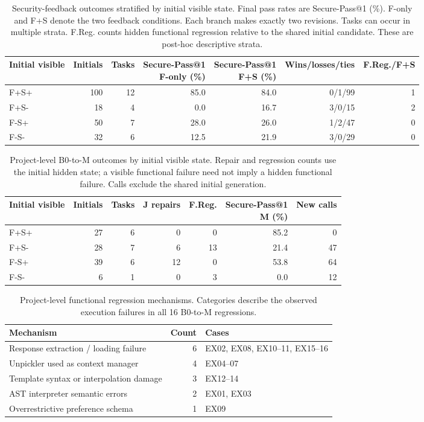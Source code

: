 \begin{table}[pos=htbp]
\caption{Security-feedback outcomes stratified by initial visible state. Final pass rates are Secure-Pass@1 (\%). F-only and F+S denote the two feedback conditions. Each branch makes exactly two revisions. Tasks can occur in multiple strata. F.Reg. counts hidden functional regression relative to the shared initial candidate. These are post-hoc descriptive strata.}
\centering\small
\begin{tabular}{lrrr rrr}
\toprule
Initial visible & Initials & Tasks & \shortstack{Secure-Pass@1\\F-only (\%)} & \shortstack{Secure-Pass@1\\F+S (\%)} & Wins/losses/ties & F.Reg./F+S \\
\midrule
F+S+ & 100 & 12 & 85.0 & 84.0 & 0/1/99 & 1 \\
F+S- & 18 & 4 & 0.0 & 16.7 & 3/0/15 & 2 \\
F-S+ & 50 & 7 & 28.0 & 26.0 & 1/2/47 & 0 \\
F-S- & 32 & 6 & 12.5 & 21.9 & 3/0/29 & 0 \\
\bottomrule
\end{tabular}
\end{table}
\begin{table}[pos=htbp]
\caption{Project-level B0-to-M outcomes by initial visible state. Repair and regression counts use the initial hidden state; a visible functional failure need not imply a hidden functional failure. Calls exclude the shared initial generation.}
\centering\small
\begin{tabular}{lrrrrrr}
\toprule
Initial visible & Initials & Tasks & J repairs & F.Reg. & \shortstack{Secure-Pass@1\\M (\%)} & New calls \\
\midrule
F+S+ & 27 & 6 & 0 & 0 & 85.2 & 0 \\
F+S- & 28 & 7 & 6 & 13 & 21.4 & 47 \\
F-S+ & 39 & 6 & 12 & 0 & 53.8 & 64 \\
F-S- & 6 & 1 & 0 & 3 & 0.0 & 12 \\
\bottomrule
\end{tabular}
\end{table}
\begin{table}[pos=htbp]
\caption{Project-level functional regression mechanisms. Categories describe the observed execution failures in all 16 B0-to-M regressions.}
\centering\small
\begin{tabular}{lrl}
\toprule
Mechanism & Count & Cases \\
\midrule
Response extraction / loading failure & 6 & EX02, EX08, EX10--11, EX15--16 \\
Unpickler used as context manager & 4 & EX04--07 \\
Template syntax or interpolation damage & 3 & EX12--14 \\
AST interpreter semantic errors & 2 & EX01, EX03 \\
Overrestrictive preference schema & 1 & EX09 \\
\bottomrule
\end{tabular}
\end{table}
\FloatBarrier
